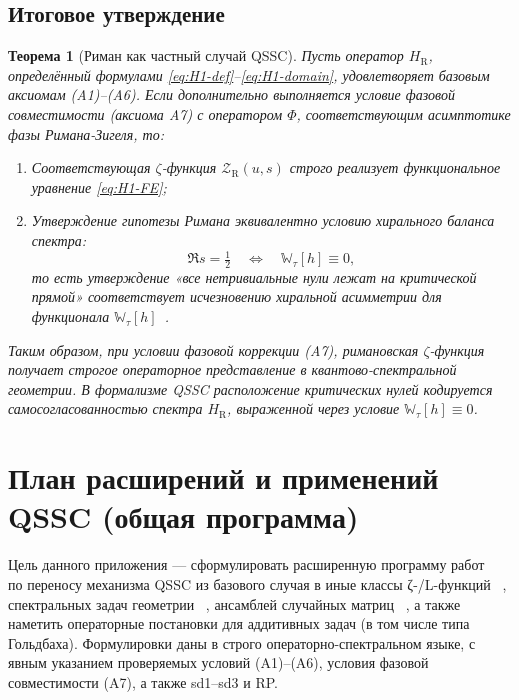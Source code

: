 \documentclass{article}
\numberwithin{equation}{section}
\theoremstyle{plain}
\newtheorem{theorem}{Теорема}
\theoremstyle{definition}
\theoremstyle{remark}
\begin{document}
\subsection*{Итоговое утверждение}

\begin{theorem}[Риман как частный случай QSSC]
Пусть оператор $H_{\mathrm R}$, определённый формулами \eqref{eq:H1-def}–\eqref{eq:H1-domain}, удовлетворяет базовым аксиомам (A1)–(A6). 
Если дополнительно выполняется \emph{условие фазовой совместимости} (аксиома A7) с оператором $\Phi$, соответствующим асимптотике фазы Римана-Зигеля, то:
\begin{enumerate}
    \item Соответствующая $\zeta$-функция $\mathcal Z_{\mathrm R}(u,s)$ строго реализует функциональное уравнение \eqref{eq:H1-FE};
    \item Утверждение гипотезы Римана эквивалентно условию хирального баланса спектра:
    \begin{equation}
    \Re s=\tfrac12 \quad\Longleftrightarrow\quad \mathbb W_\tau[h]\equiv0,
    \label{eq:QSSC0055}
    \end{equation}
    то есть утверждение «все нетривиальные нули лежат на критической прямой» соответствует исчезновению хиральной асимметрии для функционала $\mathbb W_\tau[h]$~\cite{BerryKeating1999}.
\end{enumerate}
\end{theorem}

\begin{center}
\textit{Таким образом, при условии фазовой коррекции (A7), римановская $\zeta$-функция получает строгое операторное представление в квантово-спектральной геометрии. В формализме QSSC расположение критических нулей кодируется самосогласованностью спектра $H_{\mathrm R}$, выраженной через условие $\mathbb W_\tau[h]\equiv0$.}
\end{center}

\clearpage

\section{План расширений и применений QSSC (общая программа)}

\noindent
Цель данного приложения — сформулировать расширенную программу работ ~\cite{Monakhov-QSG-000} по переносу механизма QSSC из 
базового случая в иные классы ζ-/L-функций ~\cite{IwaniecKowalski2004, Hecke1917}, спектральных задач геометрии
 ~\cite{MinakshisundaramPleijel1949, Voros1987}, 
ансамблей случайных матриц ~\cite{Mehta2004, Dyson1962}, а также наметить операторные постановки для аддитивных задач 
(в том числе типа Гольдбаха). Формулировки даны в строго операторно-спектральном языке, с явным указанием проверяемых условий (A1)–(A6), условия фазовой совместимости (A7), а также sd1–sd3 и RP.
\end{document}
